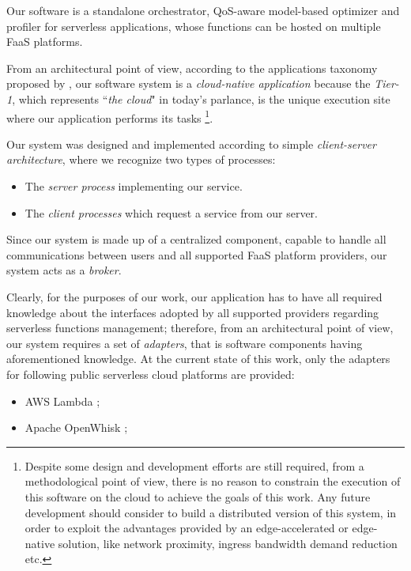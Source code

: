 \documentclass[12pt,a4paper]{report}
\newcommand{\ItalicQuotMark}[1]{``\textit{#1}"}
\begin{document}
Our software is a standalone orchestrator, QoS-aware model-based optimizer and profiler for serverless applications, whose functions can be hosted on multiple FaaS platforms.

From an architectural point of view, according to the applications taxonomy proposed by \citet{MSA}, our software system is a \textit{cloud-native application} because the \textit{Tier-1}, which represents \ItalicQuotMark{the cloud} in today’s parlance, is the unique execution site where our application performs its tasks \footnote{Despite some design and development efforts are still required, from a methodological point of view, there is no reason to constrain the execution of this software on the cloud to achieve the goals of this work. Any future development should consider to build a distributed version of this system, in order to exploit the advantages provided by an edge-accelerated or edge-native solution, like network proximity, ingress bandwidth demand reduction etc.}.

Our system was designed and implemented according to simple \textit{client-server architecture}, where we recognize two types of processes:

\begin{itemize}
	\item The \textit{server process} implementing our service.
	
	\item The \textit{client processes} which request a service from our server.
\end{itemize}


Since our system is made up of a centralized component, capable to handle all communications between users and all supported FaaS platform providers, our system acts as a \textit{broker}.

Clearly, for the purposes of our work, our application has to have all required knowledge about the interfaces adopted by all supported providers regarding serverless functions management; therefore, from an architectural point of view, our system requires a set of \textit{adapters}\cite{SDCC}, that is software components having aforementioned knowledge. At the current state of this work, only the adapters for following public serverless cloud platforms are provided:

\begin{itemize}
	\item AWS Lambda \cite{AWSLambda};
	\item Apache OpenWhisk \cite{OpenWhisk};
\end{itemize}
\end{document}
